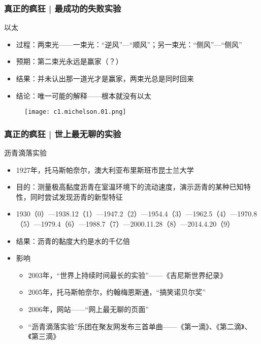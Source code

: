 \begin{frame}
  \frametitle{真正的疯狂 | 最成功的失败实验}
  \begin{block}{以太}
    \begin{itemize}
      \item 过程：两束光——一束光：“逆风”—“顺风”；另一束光：“侧风”—“侧风”
      \item 预期：第二束光永远是赢家（？）
      \item 结果：并未认出那一道光才是赢家，两束光总是同时回来
      \item 结论：唯一可能的解释——根本就没有以太
    \end{itemize}
  \end{block}
  \vspace{-0.5em}
  \begin{figure}
    \centering
    \texttt{[image: c1.michelson.01.png]}
  \end{figure}
\end{frame}

\begin{frame}
  \frametitle{真正的疯狂 | 世上最无聊的实验}
  \begin{block}{沥青滴落实验}
    \begin{itemize}
      \item 1927年，托马斯\textbullet 帕奈尔，澳大利亚布里斯班市昆士兰大学
      \item 目的：测量极高黏度沥青在室温环境下的流动速度，演示沥青的某种已知特性，同时尝试发现沥青的新型特征
      \pause
      \item 1930（0）—1938.12（1）—1947.2（2）—1954.4（3）—1962.5（4）—1970.8（5）—1979.4（6）—1988.7（7）—2000.11.28（8）—2014.4.20（9）
      \item 结果：沥青的黏度大约是水的千亿倍
      \item 影响
        \begin{itemize}
          \item 2003年，“世界上持续时间最长的实验”——《吉尼斯世界纪录》
          \item 2005年，托马斯\textbullet 帕奈尔，约翰\textbullet 梅恩斯通，“搞笑诺贝尔奖”
          \item 2006年，网站——“网上最无聊的页面”
          \item “沥青滴落实验”乐团在聚友网发布三首单曲——《第一滴》、《第二滴》、《第三滴》
        \end{itemize}
    \end{itemize}
  \end{block}
\end{frame}

